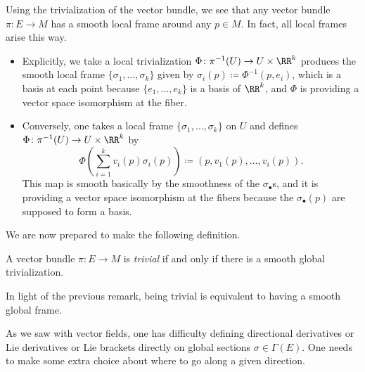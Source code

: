 \documentclass[../notes.tex]{subfiles}
\begin{document}
\begin{remark}
	Using the trivialization of the vector bundle, we see that any vector bundle $\pi\colon E\to M$ has a smooth local frame around any $p\in M$. In fact, all local frames arise this way.
	\begin{itemize}
		\item Explicitly, we take a local trivialization $\Phi\colon\pi^{-1}(U)\to U\times\RR^k$ produces the smooth local frame $\{\sigma_1,\ldots,\sigma_k\}$ given by $\sigma_i(p)\coloneqq\Phi^{-1}(p,e_i)$, which is a basis at each point because $\{e_1,\ldots,e_k\}$ is a basis of $\RR^k$, and $\Phi$ is providing a vector space isomorphism at the fiber.
		\item Conversely, one takes a local frame $\{\sigma_1,\ldots,\sigma_k\}$ on $U$ and defines $\Phi\colon\pi^{-1}(U)\to U\times\RR^k$ by
		\[\Phi\left(\sum_{i=1}^kv_i(p)\sigma_i(p)\right)\coloneqq\left(p,v_1(p),\ldots,v_i(p)\right).\]
		This map is smooth basically by the smoothness of the $\sigma_\bullet$s, and it is providing a vector space isomorphism at the fibers because the $\sigma_\bullet(p)$ are supposed to form a basis.
	\end{itemize}
\end{remark}
We are now prepared to make the following definition.
\begin{definition}[trivial]
	A vector bundle $\pi\colon E\to M$ is \textit{trivial} if and only if there is a smooth global trivialization.
\end{definition}
In light of the previous remark, being trivial is equivalent to having a smooth global frame.
\begin{remark}
	As we saw with vector fields, one has difficulty defining directional derivatives or Lie derivatives or Lie brackets directly on global sections $\sigma\in\Gamma(E)$. One needs to make some extra choice about where to go along a given direction.
\end{remark}
\end{document}
